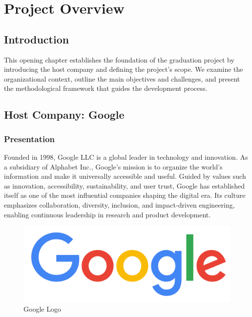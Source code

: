 \setcounter{mtc}{5} %
\chapter{Project Overview}
\minitoc  %

\graphicspath{{Chapitre1/figures/}}
\pagestyle{fancy}
\fancyhf{}
\fancyfoot[R]{\thepage}
\renewcommand{\headrulewidth}{0.5pt}
\renewcommand{\footrulewidth}{0pt}

\begin{spacing}{1.2}

\section*{Introduction}
This opening chapter establishes the foundation of the graduation project by introducing the
host company and defining the project’s scope. We examine the organizational context,
outline the main objectives and challenges, and present the methodological framework that
guides the development process.


\section{Host Company: Google} 

\subsection{Presentation} 
Founded in 1998, Google LLC is a global leader in technology and innovation. As a subsidiary of Alphabet Inc., Google’s mission is to organize the world’s information and make it universally accessible and useful. Guided by values such as innovation, accessibility, sustainability, and user trust, Google has established itself as one of the most influential companies shaping the digital era. Its culture emphasizes collaboration, diversity, inclusion, and impact-driven engineering, enabling continuous leadership in research and product development.

\begin{figure}[!ht]\centering
\includegraphics[scale=0.06]{Images/google_logo.png}
\caption{Google Logo}
\label{fig:google_logo}
\end{figure}


\end{spacing}
